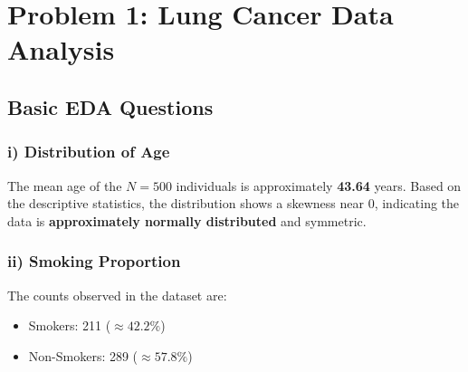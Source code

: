 \documentclass[12pt, a4paper]{article}
\begin{document}

\newpage
\tableofcontents
\newpage




\section{Problem 1: Lung Cancer Data Analysis}

\subsection{Basic EDA Questions}

\subsubsection{i) Distribution of Age}
The mean age of the $N=500$ individuals is approximately \textbf{43.64} years. Based on the descriptive statistics, the distribution shows a skewness near 0, indicating the data is \textbf{approximately normally distributed} and symmetric.

\subsubsection{ii) Smoking Proportion}
The counts observed in the dataset are:
\begin{itemize}
    \item Smokers: 211 ($\approx 42.2\%$)
    \item Non-Smokers: 289 ($\approx 57.8\%$)
\end{itemize}
\end{document}
